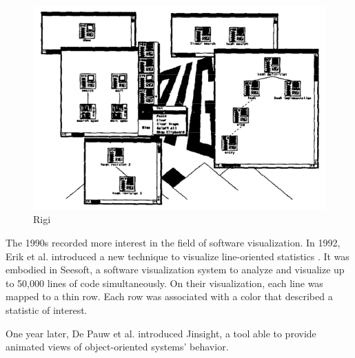 \begin{figure}[H]
  \includegraphics[width=\linewidth]{Mueller1988_Rigi.png}
  \caption{Rigi}
\endminipage\hfill
  \end{figure}



\bigbreak
The 1990s recorded more interest in the field of software visualization. 
In 1992, Erik et al. introduced a new technique to visualize line-oriented statistics \cite{Eick1992}. 
It was embodied in Seesoft, a software visualization system to analyze and visualize up to 50,000 lines of code simultaneously. 
On their visualization, each line was mapped to a thin row. Each row was associated with a color that described a statistic of interest.

\bigbreak
One year later, De Pauw et al. \cite{DePauw1993} introduced Jinsight, a tool able to provide animated views of object-oriented systems' behavior. 

